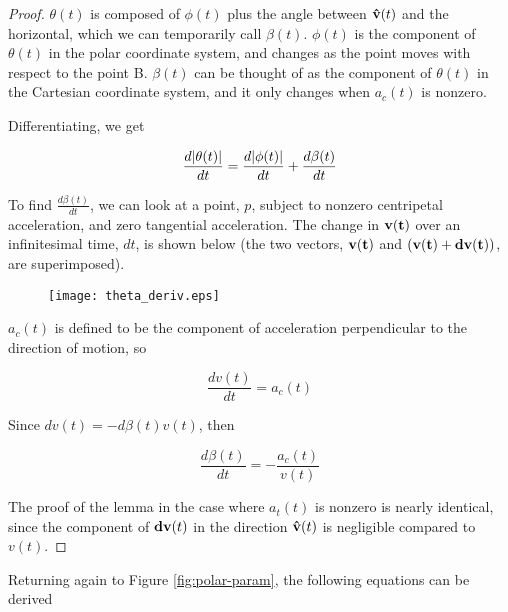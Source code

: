 \begin{proof}

$\theta(t)$ is composed of $\phi(t)$ plus the angle between $\mathbf{\hat{v}}(t)$ and the horizontal, which we can temporarily call $\beta(t)$. $\phi(t)$ is the component of $\theta(t)$ in the polar coordinate system, and changes as the point moves with respect to the point B. $\beta(t)$ can be thought of as the component of $\theta(t)$ in the Cartesian coordinate system, and it only changes when $a_c(t)$ is nonzero. 

Differentiating, we get

\[
\frac{d\abs{\theta(t)}}{dt} = \frac{d\abs{\phi(t)}}{dt} + \frac{d\beta(t)}{dt}
\]

To find $\frac{d\beta(t)}{dt}$, we can look at a point, $p$, subject to nonzero centripetal acceleration, and zero tangential acceleration. The change in $\mathbf{v(t)}$ over an infinitesimal time, $dt$, is shown below (the two vectors, $\mathbf{v(t)}$ and $\paren{\bvec{v(t)}+\bvec{dv(t)}}$, are superimposed). 

\begin{figure}[H]
    \begin{center}
      \texttt{[image: theta\_deriv.eps]}
    \end{center}
  \vspace{-.2in} %
  \caption{}
\end{figure}

$a_c(t)$ is defined to be the component of acceleration perpendicular to the direction of motion, so

\[
\frac{dv(t)}{dt} = a_c(t)
\]

Since $dv(t) = -d\beta(t) v(t)$, then

\[
\frac{d\beta(t)}{dt} = -\frac{a_c(t)}{v(t)}
\]

The proof of the lemma in the case where $a_t(t)$ is nonzero is nearly identical, since the component of $\mathbf{dv}(t)$ in the direction $\mathbf{\hat{v}}(t)$ is negligible compared to $v(t)$.

\end{proof}

Returning again to Figure \ref{fig:polar-param}, the following equations can be derived

